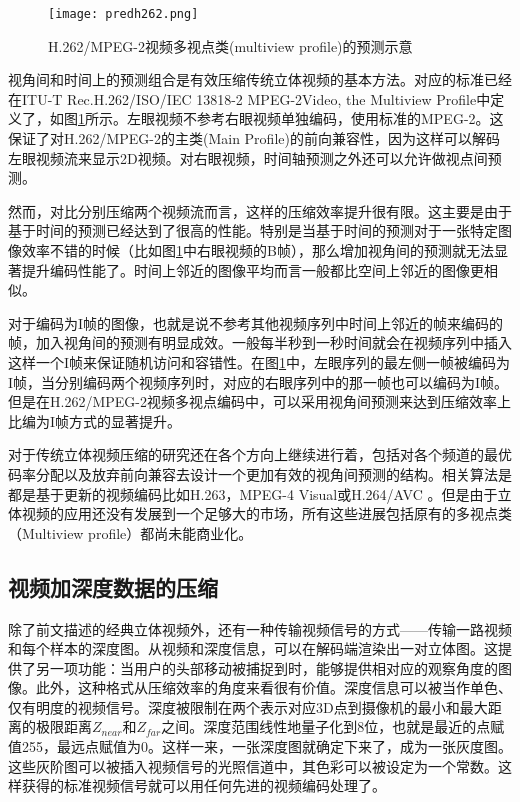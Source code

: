 \begin{figure}[htbp]
\begin{center}
\texttt{[image: predh262.png]}
\caption{H.262/MPEG-2视频多视点类(multiview profile)的预测示意}
\label{fig:predh262chs}
\end{center}
\end{figure}

视角间和时间上的预测组合是有效压缩传统立体视频的基本方法。对应的标准已经在ITU-T Rec.H.262/ISO/IEC 13818-2 MPEG-2Video, the Multiview Profile\cite{haskell1997digital, itu1994mpeg2}中定义了，如图\ref{fig:predh262chs}所示。左眼视频不参考右眼视频单独编码，使用标准的MPEG-2。这保证了对H.262/MPEG-2的主类(Main Profile)的前向兼容性，因为这样可以解码左眼视频流来显示2D视频。对右眼视频，时间轴预测之外还可以允许做视点间预测。
 
然而，对比分别压缩两个视频流而言，这样的压缩效率提升很有限。这主要是由于基于时间的预测已经达到了很高的性能。特别是当基于时间的预测对于一张特定图像效率不错的时候（比如图\ref{fig:predh262chs}中右眼视频的B帧），那么增加视角间的预测就无法显著提升编码性能了。时间上邻近的图像平均而言一般都比空间上邻近的图像更相似。

对于编码为I帧的图像，也就是说不参考其他视频序列中时间上邻近的帧来编码的帧，加入视角间的预测有明显成效。一般每半秒到一秒时间就会在视频序列中插入这样一个I帧来保证随机访问和容错性。在图\ref{fig:predh262chs}中，左眼序列的最左侧一帧被编码为I帧，当分别编码两个视频序列时，对应的右眼序列中的那一帧也可以编码为I帧。但是在H.262/MPEG-2视频多视点编码中，可以采用视角间预测来达到压缩效率上比编为I帧方式的显著提升。

对于传统立体视频压缩的研究还在各个方向上继续进行着，包括对各个频道的最优码率分配以及放弃前向兼容去设计一个更加有效的视角间预测的结构。相关算法是都是基于更新的视频编码比如H.263\cite{itu1995h263}，MPEG-4 Visual\cite{itu1999mpeg4}或H.264/AVC \cite{sun2005stereo, wiegand2003overview, itu2003h264}。但是由于立体视频的应用还没有发展到一个足够大的市场，所有这些进展包括原有的多视点类（Multiview profile）都尚未能商业化。

\subsection{视频加深度数据的压缩}

除了前文描述的经典立体视频外，还有一种传输视频信号的方式——传输一路视频和每个样本的深度图。从视频和深度信息，可以在解码端渲染出一对立体图\cite{fehn2002evolutionary,fehn20043d}。这提供了另一项功能：当用户的头部移动被捕捉到时，能够提供相对应的观察角度的图像。此外，这种格式从压缩效率的角度来看很有价值。深度信息可以被当作单色、仅有明度的视频信号。深度被限制在两个表示对应3D点到摄像机的最小和最大距离的极限距离$Z_{near}$和$Z_{far}$之间。深度范围线性地量子化到8位，也就是最近的点赋值255，最远点赋值为0。这样一来，一张深度图就确定下来了，成为一张灰度图。这些灰阶图可以被插入视频信号的光照信道中，其色彩可以被设定为一个常数。这样获得的标准视频信号就可以用任何先进的视频编码处理了。

